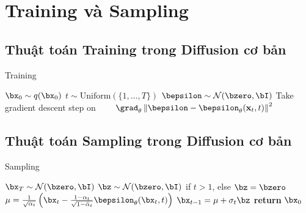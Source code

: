 \chapter{Training và Sampling}
\label{Appendix3}

\section{Thuật toán Training trong Diffusion cơ bản}
\begin{algorithm}[H]
	\caption{Training} \label{alg:training}
	\begin{algorithmic}[1]
		\footnotesize
		\Repeat
		\State $\bx_0 \sim q(\bx_0)$
		\State $t \sim \mathrm{Uniform}(\{1, \dotsc, T\})$
		\State $\bepsilon\sim\mathcal{N}(\bzero,\bI)$
		\State Take gradient descent step on
		\Statex $\qquad \grad_\theta \left\| \bepsilon - \bepsilon_\theta(\mathbf{x}_t, t) \right\|^2$
	\end{algorithmic}
\end{algorithm}

\section{Thuật toán Sampling trong Diffusion cơ bản}

\begin{algorithm}[H]
	\caption{Sampling} \label{alg:sampling}
	\footnotesize
	\begin{algorithmic}[1]
		\footnotesize
		\State $\bx_T \sim \mathcal{N}(\bzero, \bI)$
		\State $\bz \sim \mathcal{N}(\bzero, \bI)$ if $t > 1$, else $\bz = \bzero$
		\State $\mu = \frac{1}{\sqrt{\alpha_t}}\left( \bx_t - \frac{1-\alpha_t}{\sqrt{1-\bar\alpha_t}} \bepsilon_\theta(\bx_t, t) \right) $
		\State $\bx_{t-1} = \mu + \sigma_t \bz$
		\EndFor
		\State \textbf{return} $\bx_0$
		\vspace{.04in}
	\end{algorithmic}
\end{algorithm}